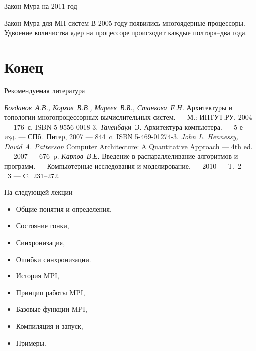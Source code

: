 \begin{frame}{Закон Мура на 2011 год}
\begin{figure}
\end{figure}
\end{frame}

\begin{frame}{Закон Мура для МП систем}
В 2005 году появились многоядерные процессоры.
\vfill
Удвоение количиства ядер на процессоре происходит каждые полтора--два года.
\end{frame}

\section*{Конец}

\begin{frame}[allowframebreaks]{Рекомендуемая литература}
\begin{thebibliography}{99}
    \bibitem{} \textit{Богданов~А.В., Корхов~В.В., Мареев~В.В., Станкова~Е.Н.}
    Архитектуры и топологии многопроцессорных вычислительных систем. --- М.:
    ИНТУТ.РУ, 2004 --- 176~с. ISBN 5-9556-0018-3.
    \bibitem{} \textit{Таненбаум~Э.} Архитектура компьютера. --- 5-е изд. ---
    СПб.~Питер, 2007 --- 844~c. ISBN 5-469-01274-3.
    \bibitem{} \textit{John L. Hennessy, David A. Patterson} Computer
    Architecture: A Quantitative Approach --- 4th ed. --- 2007 --- 676~p.
    \bibitem{} \textit{Карпов~В.Е.} Введение в распараллеливание алгоритмов и
    программ. --- Компьютерные исследования и моделирование. --- 2010 --- Т.~2
    --- \textnumero~3 --- C.~231--272.
\end{thebibliography}
\end{frame}

\begin{frame}{На следующей лекции}
\begin{itemize}
\ifsbertech
    \item Общие понятия и определения,
    \item Состояние гонки,
    \item Синхронизация,
    \item Ошибки синхронизации.
\fi
\ifmipt
    \item История MPI,
    \item Принцип работы MPI,
    \item Базовые функции MPI,
    \item Компиляция и запуск,
    \item Примеры.
\fi
\end{itemize}
\end{frame}

